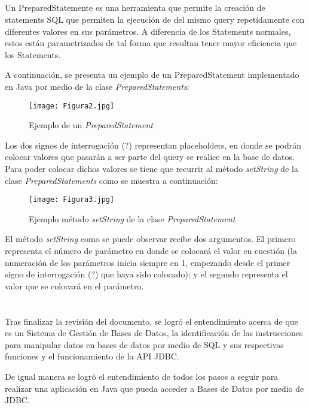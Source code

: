 \documentclass[10pt,a4paper]{article} %
\begin{document}
	
	\subsection{\color{colorESCOM}{PreparedStatements}}
	{\large Un PreparedStatemente es una herramienta que permite la creaci{\' o}n de statements SQL que permiten la ejecuci{\' o}n de del mismo query repetidamente con diferentes valores en sus par{\' a}metros. A diferencia de los Statements normales, estos est{\' a}n parametrizados de tal forma que resultan tener mayor eficiencia que los Statements.
		
		
		\vspace{0.5cm}
		A continuaci{\' o}n, se presenta un ejemplo de un PreparedStatement implementado en Java por medio de la clase \textit{PreparedStatements}:
		
		\begin{figure}[H]
			\texttt{[image: Figura2.jpg]}
			\centering
			\caption{Ejemplo de un \textit{PreparedStatement}}
			\label{img:Figura2}
		\end{figure}
		
		Los dos signos de interrogaci{\' o}n (?) representan placeholders, en donde se podr{\' a}n colocar valores que pasar{\' a}n a ser parte del query se realice en la base de datos. Para poder colocar dichos valores se tiene que recurrir al método \textit{setString} de la clase \textit{PreparedStatements} como se muestra a continuaci{\' o}n:
		
		\begin{figure}[H]
			\texttt{[image: Figura3.jpg]}
			\centering
			\caption{Ejemplo método \textit{setString} de la clase \textit{PreparedStatement}}
			\label{img:Figura3}
		\end{figure}
		
		El método \textit{setString} como se puede observar recibe dos argumentos. El primero representa el n{\' u}mero de par{\' a}metro en donde se colocar{\' a} el valor en cuesti{\' o}n (la numeraci{\' o}n de los par{\' a}metros inicia siempre en 1, empezando desde el primer signo de interrogaci{\' o}n (?) que haya sido colocado); y el segundo representa el valor que se colocar{\' a} en el par{\' a}metro.
	}
	
	\pagebreak
	
	\section{\color{colorIPN}{Resultados}}
	{\large Tras finalizar la revisi{\' o}n del documento, se logr{\' o} el entendimiento acerca de que es un Sistema de Gesti{\' o}n de Bases de Datos, la identificaci{\' o}n de las instrucciones para manipular datos en bases de datos por medio de SQL y sus respectivas funciones y el funcionamiento de la API JDBC.
		
		
		\vspace{0.5cm}
		De igual manera se logr{\' o} el entendimiento de todos los pasos a seguir para realizar una aplicaci{\' o}n en Java que pueda acceder a Bases de Datos por medio de JDBC.}
	
\end{document}

